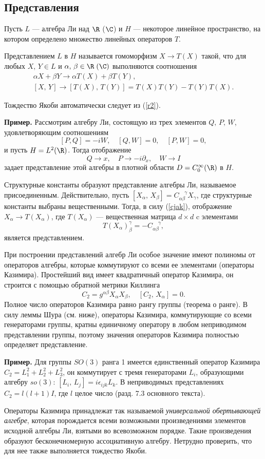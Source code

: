 \documentclass[a4paper
]{article}
\begin{document}
\subsection{Представления}
Пусть $L$ ---  алгебра Ли над $\R$   ($\C$) и $H$ ---  некоторое
линейное пространство, на котором определено множество линейных
операторов $T$.
\begin{Def}
Представлением $L$ в  $H$   называется гомоморфизм $X\to T(X)$
такой, что для любых $X,\, Y\in L$ и $\alpha, \,\beta \in \R
\;(\C)$ выполняются соотношения
\begin{align}
 \alpha X + \beta Y\to \alpha T(X) + \beta T(Y),\label{r1}\\
 [X,\,Y]\to [T(X),\,T(Y)]= T(X)T(Y)-T(Y)T(X)\label{r2}.
\end{align}
\end{Def}
\noindent Тождество Якоби автоматически следует из (\ref{r2}).\par
{\bf Пример.} Рассмотрим алгебру Ли, состоящую из трех элементов
$Q,\,P,\,W$, удовлетворяющим соотношениям $$[P,Q]=-iW,\quad
[Q,W]=0,\quad [P,W]=0,$$ и пусть $H=L^2(\R)$. Тогда отображение
$$Q\to x,\quad P\to -i\partial_x,\quad W\to I$$ задает
представление этой алгебры в плотной области $D=C_0^\infty(\R)$ в
$H$. \par Структурные константы образуют представление алгебры Ли,
называемое присоединенным.   Действительно, пусть
$[X_\alpha,\,X_\beta]=C_{\alpha\beta}^{\;\;\;\;\gamma} X_\gamma$,
где структурные константы выбраны вещественными. Тогда, в силу
(\ref{cjak}), отображение $X_\alpha\to T(X_\alpha)$, где
$T(X_\alpha)$ --- вещественная матрица $d\times d$ c элементами
$$T(X_\alpha)^\gamma_\beta=-C_{\alpha\beta}^{\;\;\;\;\gamma},$$
является представлением.
\par
При построении представлений алгебр Ли особое значение имеют
полиномы от операторов алгебры, которые коммутируют со всеми ее
элементами (операторы Казимира). Простейший вид имеет квадратичный
оператор Казимира, он строится с помощью обратной метрики Киллинга
\begin{equation}\label{Casimir2}
    C_2=g^{\alpha\beta} X_\alpha X_\beta,\quad [C_2,\,X_\alpha]=0.
\end{equation}
Полное число операторов Казимира равно рангу группы (теорема о
ранге). В силу леммы Шура (см. ниже), операторы Казимира,
коммутирующие со всеми генераторами группы, кратны единичному
оператору в любом неприводимом представлении группы, поэтому
значения  операторов Казимира полностью определяет представление.
\par
{\bf Пример.} Для группы $SO(3)$ ранга 1 имеется единственный
оператор Казимира $C_2=L_1^2+L_2^2+L_3^2$, он коммутирует с тремя
генераторами $L_i$, образующими алгебру $so(3)$:
$[L_i,\,L_j]=i\epsilon_{ijk} L_k$. В неприводимых представлениях
$C_2=l(l+1)I$, где $l$ целое число (разд. 7.3 основного текста).
\par
Операторы Казимира принадлежат так называемой {\em универсальной
обертывающей алгебре}, которая порождается всеми возможными
произведениями элементов исходной алгебры Ли, взятыми во
всевозможном порядке. Такие произведения образуют бесконечномерную
ассоциативную алгебру. Нетрудно проверить, что для нее также
выполняется тождество Якоби.
\end{document}
